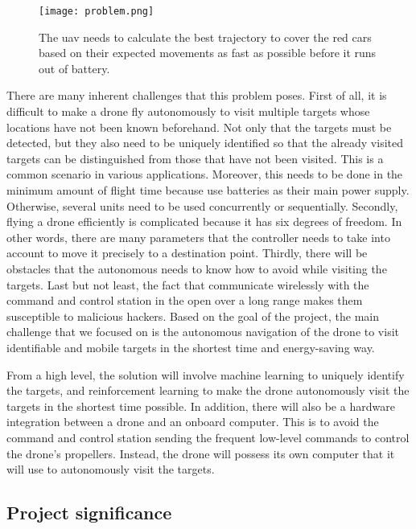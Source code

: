 \documentclass[../main.tex]{subfiles}
\begin{document}
\begin{figure}[tb] 
    \centering
    \texttt{[image: problem.png]} 
    \caption{The \gls{uav} needs to calculate 
    the best trajectory to cover the red cars
    based on their expected movements
    as fast as possible before it runs out of battery.} 
    \label{fig:problem} 
\end{figure}

There are many inherent challenges that this problem
poses. First of all, it is difficult to make a drone
fly autonomously to visit multiple targets whose locations
have not been known beforehand. 
Not only that the targets must be detected, 
but they also need to be uniquely
identified so that the already visited targets
can be distinguished from those that have not been visited.
This is a common scenario in various applications. 
Moreover, this needs to be done in the minimum
amount of flight time because \uavs use batteries
as their main power supply.
Otherwise, several units need to be used concurrently
or sequentially.
Secondly, flying a drone efficiently is complicated 
because it has six degrees of freedom. In other words, 
there are many parameters that the controller needs to 
take into account to move 
it precisely to a destination point. 
Thirdly, there will be obstacles that the autonomous \uav
needs to know how to avoid while visiting the targets.
Last but not least, the fact that \uavs communicate wirelessly
with the command and control station in the open 
over a long range makes them susceptible
to malicious hackers.
Based on the goal of the project, the main challenge 
that we focused on is the autonomous navigation
of the drone to visit identifiable and mobile targets in the shortest
time and energy-saving way.

From a high level, the solution will involve machine learning
to uniquely identify the targets, and reinforcement learning
to make the drone autonomously visit the targets in the
shortest time possible. In addition, there will also be
a hardware integration between a drone and an onboard
computer. This is to avoid the command and control
station sending the frequent low-level commands to control
the drone's propellers. 
Instead, the drone
will possess its own computer that it will use to 
autonomously visit the targets.

\subsection{Project significance}
\end{document}
